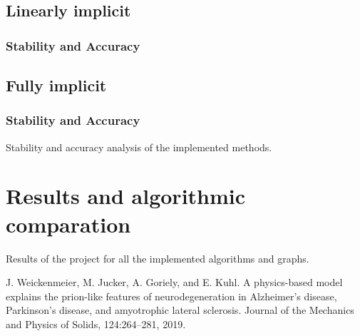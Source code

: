 \documentclass[12pt, letterpaper]{article}
\begin{document}
\subsection{Linearly implicit}
\subsubsection{Stability and Accuracy}

\subsection{Fully implicit}
\subsubsection{Stability and Accuracy}

Stability and accuracy analysis of the implemented methods.

\section{Results and algorithmic comparation}
Results of the project for all the implemented algorithms and graphs.

\begin{thebibliography}{9}
    J. Weickenmeier, M. Jucker, A. Goriely, and E. Kuhl. A physics-based model explains the prion-like features of neurodegeneration in Alzheimer’s disease, Parkinson’s disease, and amyotrophic lateral sclerosis. Journal of the Mechanics and
    Physics of Solids, 124:264–281, 2019.
\end{thebibliography}
\end{document}
